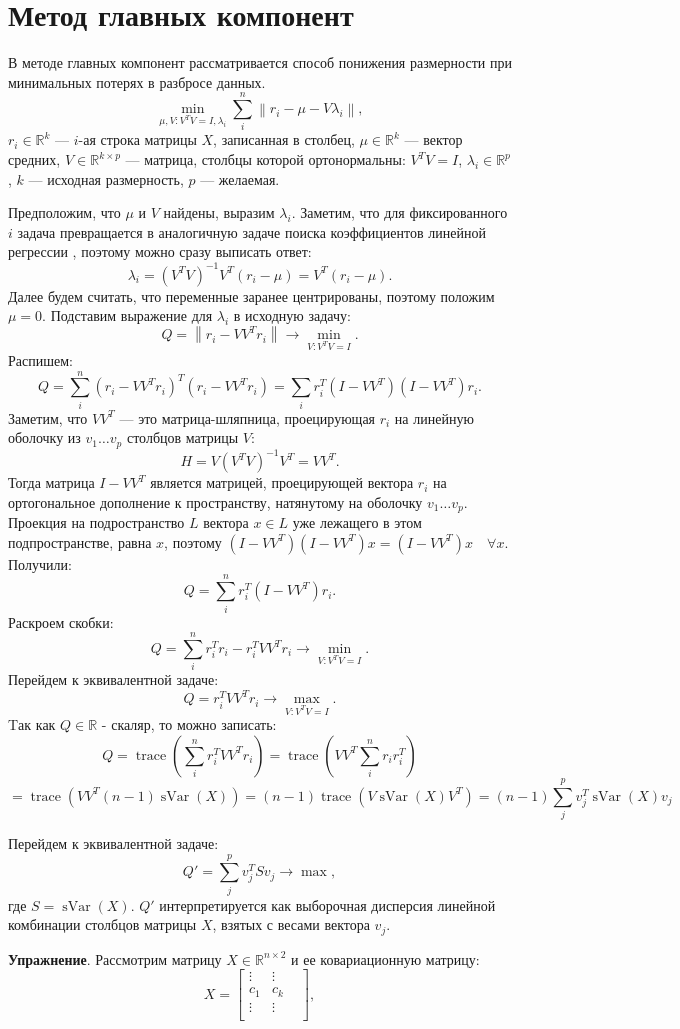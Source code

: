 \documentclass[12pt]{article} %
\theoremstyle{definition} %
\DeclareMathOperator{\sVar}{sVar}
\DeclareMathOperator{\tr}{trace}
\def \RR{\mathbb{R}}
\begin{document}
\section{Метод главных компонент}
В методе главных компонент рассматривается способ понижения размерности при минимальных потерях в разбросе данных.
\[ \min_{\mu, V: V^TV=I, \lambda_i} \sum_{i}^n \left\|r_i - \mu - V\lambda_i \right\|, \]
\(r_i \in \RR^k\) — \(i\)-ая строка матрицы \(X\), записанная в столбец,
\(\mu \in \RR^k\) — вектор средних, \(V \in \RR^{k \times p}\)  —  матрица, столбцы которой ортонормальны: \( V^TV=I \), \( \lambda_i \in \RR^p\), \(k\)  —  исходная размерность, \(p\)  —  желаемая.

Предположим, что \(\mu\) и \(V\) найдены, выразим \(\lambda_i\). Заметим, что для фиксированного \(i\) задача превращается в аналогичную задаче поиска коэффициентов линейной регрессии , поэтому можно сразу выписать ответ:
\[\lambda_i = (V^TV)^{-1}V^T(r_i-\mu) = V^T(r_i-\mu).\]
Далее будем считать, что переменные заранее центрированы, поэтому положим \(\mu=0\).
Подставим выражение для \(\lambda_i\) в исходную задачу:
\[Q = \left\| r_i - VV^T r_i \right\| \to \min_{V: V^TV=I} .\]
Распишем:
\[Q = \sum_i^n (r_i - VV^Tr_i)^T (r_i - VV^Tr_i) =
\sum_i r_i^T (I-VV^T)(I-VV^T)r_i.\]
Заметим, что \(VV^T\)  —  это матрица-шляпница, проецирующая \(r_i\) на линейную оболочку из \(v_1 \dots v_p\) столбцов матрицы \(V\):
\[ H = V (V^TV)^{-1} V^T = VV^T.\]
Тогда матрица \( I-VV^T \) является матрицей, проецирующей вектора \(r_i\) на ортогональное дополнение к пространству, натянутому на оболочку \(v_1 \dots v_p\).
Проекция на подространство \(L\) вектора \(x \in L\) уже лежащего в этом подпространстве, равна \(x\), поэтому  \( (I-VV^T)(I-VV^T)x=(I-VV^T)x \quad \forall x\).
Получили:
\[ Q = \sum_i^n r_i^T(I - VV^T)r_i. \]
Раскроем скобки:
\[Q = \sum_i^n r_i^T r_i - r_i^T VV^T r_i \to \min_{V: V^TV=I}.\]
Перейдем к эквивалентной задаче:
\[Q=r_i^T VV^T r_i \to \max_{V: V^TV=I}.\]
Tак как \(Q \in \RR\) - скаляр, то можно записать:
\[Q = \tr (\sum_i^n r_i^T VV^T r_i ) =
 \tr (VV^T \sum_i^n r_i r_i^T) \]
 \[
 = \tr (VV^T (n-1)\sVar(X))=
 (n-1)\tr (V \sVar(X) V^T )
 = (n-1) \sum_{j}^p v_j^T \sVar(X) v_j \]

Перейдем к эквивалентной задаче:
\[Q' = \sum_{j}^p v_j^T S v_j \to \max,\]
где \(S = \sVar(X)\). \(Q'\) интерпретируется как выборочная дисперсия линейной комбинации столбцов матрицы \(X\), взятых с весами вектора \(v_j\).

\textbf{Упражнение}. Рассмотрим матрицу \(X \in \RR^{n \times 2}\) и ее ковариационную матрицу:
\[
X = \begin{bmatrix}
    \vdots & \vdots & \\
    c_1 &  c_k \\
    \vdots &   \vdots & \\
    \end{bmatrix},
\]
\end{document}
